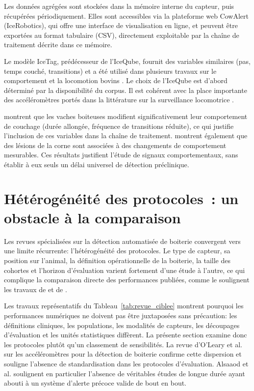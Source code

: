 Les données agrégées sont stockées dans la mémoire interne du capteur, puis récupérées
périodiquement. Elles sont accessibles via la plateforme web CowAlert (IceRobotics), qui
offre une interface de visualisation en ligne, et peuvent être exportées au format tabulaire
(CSV), directement exploitable par la chaîne de traitement décrite dans ce mémoire.

Le modèle IceTag, prédécesseur de l'IceQube, fournit des variables similaires (pas, temps
couché, transitions) et a été utilisé dans plusieurs travaux sur le comportement et la
locomotion bovins \citep{beer2016objective,alsaaod2012electronic}. Le choix de l'IceQube
est d'abord déterminé par la disponibilité du corpus. Il est cohérent avec la place
importante des accéléromètres portés dans la littérature sur la surveillance locomotrice
\citep{oleary2020accelerometers,bewley2015precision}.

\cite{ito2010lying} montrent que les vaches boiteuses modifient significativement leur
comportement de couchage (durée allongée, fréquence de transitions réduite), ce qui
justifie l'inclusion de ces variables dans la chaîne de traitement. \cite{nechanitzky2016analysis}
montrent également que des lésions de la corne sont associées à des changements de
comportement mesurables. Ces résultats justifient l'étude de signaux comportementaux,
sans établir à eux seuls un délai universel de détection préclinique.

\section{Hétérogénéité des protocoles~: un obstacle à la comparaison}

Les revues spécialisées sur la détection automatisée de boiterie convergent vers une
limite récurrente: l'hétérogénéité des protocoles. Le type de capteur, sa position sur
l'animal, la définition opérationnelle de la boiterie, la taille des cohortes et l'horizon
d'évaluation varient fortement d'une étude à l'autre, ce qui complique la comparaison
directe des performances publiées, comme le soulignent les travaux de
\citet{oleary2020accelerometers} et de \citet{alsaaod2019automatic}.

Les travaux représentatifs du Tableau~\ref{tab:revue_ciblee} montrent pourquoi les
performances numériques ne doivent pas être juxtaposées sans précaution: les définitions
cliniques, les populations, les modalités de capteurs, les découpages d'évaluation et les
unités statistiques diffèrent. La présente section examine donc les protocoles plutôt qu'un
classement de sensibilités.
La revue d'O'Leary et al. \citep{oleary2020accelerometers} sur les accéléromètres pour la
détection de boiterie confirme cette dispersion et souligne l'absence de standardisation
dans les protocoles d'évaluation.
Alsaaod et al. \citep{alsaaod2019automatic} soulignent en particulier l'absence
de véritables études de longue durée ayant abouti à un système d'alerte précoce valide de
bout en bout.

